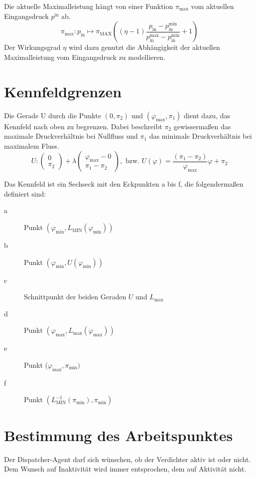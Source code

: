 \documentclass{article}
\newcommand{\piMAX}{\pi_\text{MAX}}
\newcommand{\pimin}{\pi_\text{min}}
\newcommand{\pimax}{\pi_\text{max}}
\newcommand{\phimin}{\varphi_\text{min}}
\newcommand{\phimax}{\varphi_\text{max}}
\newcommand{\LMIN}{L_\text{MIN}}
\newcommand{\Lmax}{L_\text{max}}
\newcommand{\pin}{p_\text{in}}
\begin{document}
Die aktuelle Maximalleistung hängt von einer Funktion $\pimax$ vom aktuellen Eingangsdruck $p^\text{in}$ ab.
$$\pimax: p_\text{in} \longmapsto \piMAX \left( (\eta - 1) \frac{\pin - \pin^{\text{min}}}{\pin^{\text{max}} - \pin^{\text{min}}} + 1 \right)$$
Der Wirkungsgrad $\eta$ wird dazu genutzt die Abhängigkeit der aktuellen Maximalleistung vom Eingangsdruck zu modellieren.
 
\section{Kennfeldgrenzen}

Die Gerade U durch die Punkte $(0, \pi_2)$ und $(\phimax, \pi_1)$ dient dazu, das Kennfeld nach oben zu begrenzen.
Dabei beschreibt $\pi_2$  gewissermaßen das maximale Druckverhältnis bei Nullfluss und $\pi_1$ das minimale Druckverhältnis bei maximalem Fluss.
$$U: \begin{pmatrix} 0 \\ \pi_2 \end{pmatrix} + \lambda \begin{pmatrix} \phimax - 0 \\ \pi_1 - \pi_2 \end{pmatrix},\text{ bzw. } U(\varphi)=\frac{(\pi_1-\pi_2)}{\phimax}\varphi+\pi_2$$


Das Kennfeld ist ein Sechseck mit den Eckpunkten a bis f, die folgendermaßen definiert sind:
\begin{description}

\item[a]  Punkt $(\varphi_\text{min},L_\text{MIN}(\varphi_\text{min}))$
\item[b]  Punkt $(\varphi_\text{min}, U(\phimin))$
\item [c] Schnittpunkt der beiden Geraden $U$ und $\Lmax$
\item [d] Punkt $(\phimax, \Lmax(\phimax))$
\item [e] Punkt ($\phimax, \pimin)$  
\item [f] Punkt $(\LMIN^{-1}(\pimin), \pimin)$ 

\end{description}


\section{ Bestimmung des Arbeitspunktes}

Der Dispatcher-Agent darf sich wünschen, ob der Verdichter aktiv ist
oder nicht. Dem Wunsch auf Inaktivität wird immer entsprochen, dem auf
Aktivität nicht.
\end{document}
